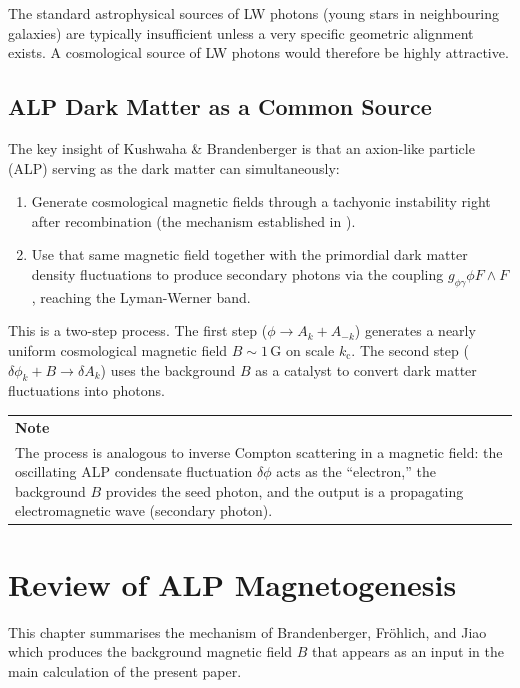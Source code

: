 \documentclass[12pt,a4paper]{report}
\newenvironment{notebox}[1][Note]{%
  \par\medskip\noindent
  \begin{tabular}{|p{\dimexpr\linewidth-2\tabcolsep-2\arrayrulewidth\relax}|}
  \hline
  \textbf{#1}\\[2pt]
}{%
  \\ \hline
  \end{tabular}
  \par\medskip
}
\newcommand{\kc}{k_{\mathrm{c}}}
\newcommand{\gag}{g_{\phi\gamma}}
\theoremstyle{definition}
\begin{document}
The standard astrophysical sources of LW photons (young stars in neighbouring galaxies)
are typically insufficient unless a very specific geometric alignment exists. A
cosmological source of LW photons would therefore be highly attractive.

\section{ALP Dark Matter as a Common Source}

The key insight of Kushwaha \& Brandenberger is that an axion-like particle (ALP)
serving as the dark matter can simultaneously:
\begin{enumerate}[noitemsep]
  \item Generate cosmological magnetic fields through a tachyonic instability right
    after recombination (the mechanism established in \cite{Brandenberger2026}).
  \item Use that same magnetic field together with the primordial dark matter density
    fluctuations to produce secondary photons via the coupling $\gag\phi F\wedge F$,
    reaching the Lyman-Werner band.
\end{enumerate}

This is a two-step process. The first step ($\phi\to A_k+A_{-k}$) generates a nearly
uniform cosmological magnetic field $B\sim 1\,\mathrm{G}$ on scale $\kc$. The second
step ($\delta\phi_k + B \to \delta A_k$) uses the background $B$ as a catalyst to
convert dark matter fluctuations into photons.

\begin{notebox}
The process is analogous to inverse Compton scattering in a magnetic field: the
oscillating ALP condensate fluctuation $\delta\phi$ acts as the ``electron,'' the
background $B$ provides the seed photon, and the output is a propagating electromagnetic
wave (secondary photon).
\end{notebox}

\chapter{Review of ALP Magnetogenesis}

This chapter summarises the mechanism of Brandenberger, Fr\"{o}hlich, and Jiao
\cite{Brandenberger2026} which produces the background magnetic field $B$ that appears
as an input in the main calculation of the present paper.
\end{document}

